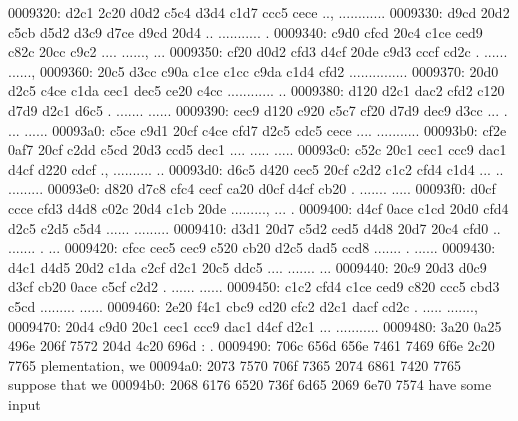 \begin{bo
00010e0: 7865 647d 5c62 6567 696e 7b76 6572 6261  xed}
\begin{verba
00010f0: 7469 6d7d 0a20 2023 7479 7065 2074 6572  tim}
\begin{
0001c40: 7665 7262 6174 696d 7d0a 2020 236c 6574  verbatim}
\begin{boxe
00027a0: 647d 5c62 6567 696e 7b76 6572 6261 7469  d}
\begin{verbati
00027b0: 6d7d 0a20 2023 6c65 7420 696e 6669 7865  m}
\begin{v
0002c60: 6572 6261 7469 6d7d 0a20 2023 6c65 7420  erbatim}
\begin{
0002dc0: 7665 7262 6174 696d 7d0a 2020 236c 6574  verbatim}
\begin{boxed
0002f30: 7d5c 6265 6769 6e7b 7665 7262 6174 696d  }
\begin{verbatim
0002f40: 7d0a 2020 236c 6574 2068 6428 683a 3a74  }
\begin{v
0003e60: 6572 6261 7469 6d7d 0a20 2023 236f 7065  erbatim}
\begin{boxed
00042b0: 7d5c 6265 6769 6e7b 7665 7262 6174 696d  }
\begin{verbatim
00042c0: 7d0a 2020 2328 782c 7429 3b3b 0a20 202d  }
\begin{boxed}
0009320: d2c1 2c20 d0d2 c5c4 d3d4 c1d7 ccc5 cece  .., ............
0009330: d9cd 20d2 c5cb d5d2 d3c9 d7ce d9cd 20d4  .. ........... .
0009340: c9d0 cfcd 20c4 c1ce ced9 c82c 20cc c9c2  .... ......, ...
0009350: cf20 d0d2 cfd3 d4cf 20de c9d3 cccf cd2c  . ...... ......,
0009360: 20c5 d3cc c90a c1ce c1cc c9da c1d4 cfd2   ...............
0009370: 20d0 d2c5 c4ce c1da cec1 dec5 ce20 c4cc   ............ ..
0009380: d120 d2c1 dac2 cfd2 c120 d7d9 d2c1 d6c5  . ....... ......
0009390: cec9 d120 c920 c5c7 cf20 d7d9 dec9 d3cc  ... . ... ......
00093a0: c5ce c9d1 20cf c4ce cfd7 d2c5 cdc5 cece  .... ...........
00093b0: cf2e 0af7 20cf c2dd c5cd 20d3 ccd5 dec1  .... ..... .....
00093c0: c52c 20c1 cec1 ccc9 dac1 d4cf d220 cdcf  ., .......... ..
00093d0: d6c5 d420 cec5 20cf c2d2 c1c2 cfd4 c1d4  ... .. .........
00093e0: d820 d7c8 cfc4 cecf ca20 d0cf d4cf cb20  . ....... ..... 
00093f0: d0cf ccce cfd3 d4d8 c02c 20d4 c1cb 20de  ........., ... .
0009400: d4cf 0ace c1cd 20d0 cfd4 d2c5 c2d5 c5d4  ...... .........
0009410: d3d1 20d7 c5d2 ced5 d4d8 20d7 20c4 cfd0  .. ....... . ...
0009420: cfcc cec5 cec9 c520 cb20 d2c5 dad5 ccd8  ....... . ......
0009430: d4c1 d4d5 20d2 c1da c2cf d2c1 20c5 ddc5  .... ....... ...
0009440: 20c9 20d3 d0c9 d3cf cb20 0ace c5cf c2d2   . ...... ......
0009450: c1c2 cfd4 c1ce ced9 c820 ccc5 cbd3 c5cd  ......... ......
0009460: 2e20 f4c1 cbc9 cd20 cfc2 d2c1 dacf cd2c  . ..... .......,
0009470: 20d4 c9d0 20c1 cec1 ccc9 dac1 d4cf d2c1   ... ...........
0009480: 3a20 0a25 496e 206f 7572 204d 4c20 696d  : .%
0009490: 706c 656d 656e 7461 7469 6f6e 2c20 7765  plementation, we
00094a0: 2073 7570 706f 7365 2074 6861 7420 7765   suppose that we
00094b0: 2068 6176 6520 736f 6d65 2069 6e70 7574   have some input

\end{boxed}
\end{verbatim
00042c0: 7d0a 2020 2328 782c 7429 3b3b 0a20 202d  }
\end{boxed
00042b0: 7d5c 6265 6769 6e7b 7665 7262 6174 696d  }
\end{v
0003e60: 6572 6261 7469 6d7d 0a20 2023 236f 7065  erbatim}
\end{verbatim
0002f40: 7d0a 2020 236c 6574 2068 6428 683a 3a74  }
\end{boxed
0002f30: 7d5c 6265 6769 6e7b 7665 7262 6174 696d  }
\end{
0002dc0: 7665 7262 6174 696d 7d0a 2020 236c 6574  verbatim}
\end{v
0002c60: 6572 6261 7469 6d7d 0a20 2023 6c65 7420  erbatim}
\end{verbati
00027b0: 6d7d 0a20 2023 6c65 7420 696e 6669 7865  m}
\end{boxe
00027a0: 647d 5c62 6567 696e 7b76 6572 6261 7469  d}
\end{
0001c40: 7665 7262 6174 696d 7d0a 2020 236c 6574  verbatim}
\end{verba
00010f0: 7469 6d7d 0a20 2023 7479 7065 2074 6572  tim}
\end{bo
00010e0: 7865 647d 5c62 6567 696e 7b76 6572 6261  xed}
